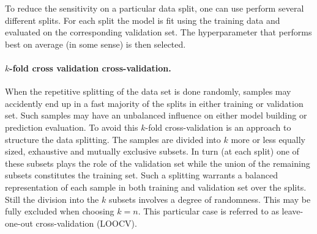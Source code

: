 \documentclass[%
oneside,                 %
final,                   %
10pt]{article}
\begin{document}
\noindent
To reduce the sensitivity on a particular data split, one can use perform several different splits. For each split the model is fit using the training data and
evaluated on the corresponding validation set. The hyperparameter that performs best on average (in some sense) is then selected.


\paragraph{$k$-fold cross validation cross-validation.}
When the repetitive splitting of the data set is done randomly,
samples may accidently end up in a fast majority of the splits in
either training or validation set. Such samples may have an unbalanced
influence on either model building or prediction evaluation. To avoid
this $k$-fold cross-validation is an approach to structure the data splitting. The
samples are divided into $k$ more or less equally sized, exhaustive and
mutually exclusive subsets. In turn (at each split) one of these
subsets plays the role of the validation set while the union of the
remaining subsets constitutes the training set. Such a splitting
warrants a balanced representation of each sample in both training and
validation set over the splits. Still the division into the $k$ subsets
involves a degree of randomness. This may be fully excluded when
choosing $k=n$. This particular case is referred to as leave-one-out
cross-validation (LOOCV). 

\end{document}
